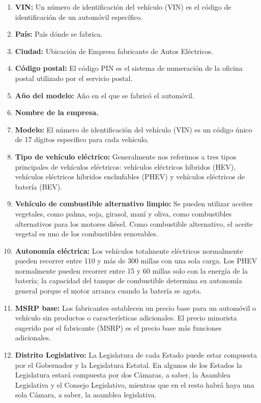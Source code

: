 \documentclass[12pt]{article}
\begin{document}
\begin{enumerate}
    \item \textbf{VIN:} Un número de identificación del vehículo (VIN) es el código de identificación de un automóvil específico.
    \item \textbf{País:} País dónde se fabrica.
    \item \textbf{Ciudad:} Ubicación de Empresa fabricante de Autos Eléctricos.
    \item \textbf{Código postal:} El código PIN es el sistema de numeración de la oficina postal utilizado por el servicio postal.
    \item \textbf{Año del modelo:} Año en el que se fabricó el automóvil.
    \item \textbf{Nombre de la empresa.}
    \item \textbf{Modelo:} El número de identificación del vehículo (VIN) es un código único de 17 dígitos específico para cada vehículo.
    \item \textbf{Tipo de vehículo eléctrico:} Generalmente nos referimos a tres tipos principales de vehículos eléctricos: vehículos eléctricos híbridos (HEV), vehículos eléctricos híbridos enchufables (PHEV) y vehículos eléctricos de batería (BEV).
    \item \textbf{Vehículo de combustible alternativo limpio:} Se pueden utilizar aceites vegetales, como palma, soja, girasol, maní y oliva, como combustibles alternativos para los motores diésel. Como combustible alternativo, el aceite vegetal es uno de los combustibles renovables.
    \item \textbf{Autonomía eléctrica:} Los vehículos totalmente eléctricos normalmente pueden recorrer entre 110 y más de 300 millas con una sola carga. Los PHEV normalmente pueden recorrer entre 15 y 60 millas solo con la energía de la batería; la capacidad del tanque de combustible determina su autonomía general porque el motor arranca cuando la batería se agota.
    \item \textbf{MSRP base:} Los fabricantes establecen un precio base para un automóvil o vehículo sin productos o características adicionales. El precio minorista sugerido por el fabricante (MSRP) es el precio base más funciones adicionales.
    \item \textbf{Distrito Legislativo:} La Legislatura de cada Estado puede estar compuesta por el Gobernador y la Legislatura Estatal. En algunos de los Estados la Legislatura estará compuesta por dos Cámaras, a saber, la Asamblea Legislativa y el Consejo Legislativo, mientras que en el resto habrá haya una sola Cámara, a saber, la asamblea legislativa.

\end{enumerate}
\end{document}
